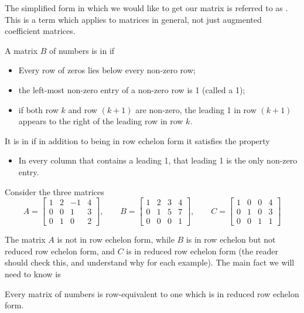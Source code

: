 \documentclass{ximera}
\begin{document}
The simplified form in which we would like to get our matrix is
referred to as . This is a term which
applies to matrices in general, not just augmented coefficient
matrices.

\begin{definition} A matrix $B$ of numbers is in  if
\begin{itemize}
\item Every row of zeros lies below every non-zero row;
\item the left-most non-zero entry of a non-zero row is 1 (called a  1);
\item if both row $k$ and row $(k+1)$ are non-zero, the leading 1 in row $(k+1)$ appears to the right of the leading row in row $k$.
\end{itemize}
It is in  if in addition to being in row echelon form it satisfies the property
\begin{itemize}
\item In every column that contains a leading 1, that leading 1 is the only non-zero entry.
\end{itemize}
\end{definition}

\begin{example} Consider the three matrices
\[
A = \begin{bmatrix}
1 & 2 & -1 & 4\\
0 & 0 & 1 & 3\\
0 & 1 & 0 & 2
\end{bmatrix},\qquad
B = \begin{bmatrix}
1 & 2 & 3 & 4\\
0 & 1 & 5 & 7\\
0 & 0 & 0 & 1
\end{bmatrix},\qquad
C = \begin{bmatrix}
1 & 0 & 0 & 4\\
0 & 1 & 0 & 3\\
0 & 0 & 1 & 1
\end{bmatrix}
\]
\end{example}

The matrix $A$ is not in row echelon form, while $B$ is in row echelon but not reduced row echelon form, and $C$ is in reduced row echelon form (the reader should check this, and understand why for each example). The main fact we will need to know is

\begin{theorem} Every matrix of numbers is row-equivalent to one which is in reduced row echelon form.
\end{theorem}
\end{document}
